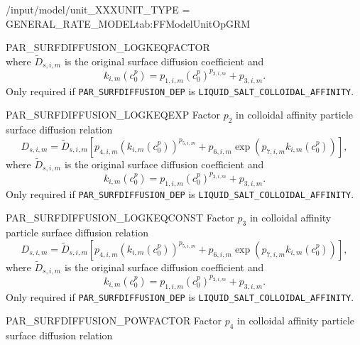 \begin{condsubgroup}{/input/model/unit\_XXX}{UNIT\_TYPE = GENERAL\_RATE\_MODEL}{tab:FFModelUnitOpGRM}
\begin{dataset}[unit=--,type=double,range={$\mathds{R}$},length={\texttt{NBND}}]{PAR\_SURFDIFFUSION\_LOGKEQFACTOR}
\begin{equation*}
    \end{equation*}
    where $\tilde{D}_{s,i,m}$ is the original surface diffusion coefficient and
    \begin{equation*}
      k_{i,m}( c^p_0 ) = p_{1,i,m} \left(c^p_0\right)^{p_{2,i,m}} + p_{3,i,m}.
    \end{equation*}
    Only required if \texttt{PAR\_SURFDIFFUSION\_DEP} is \texttt{LIQUID\_SALT\_COLLOIDAL\_AFFINITY}.
  \end{dataset}
  \begin{dataset}[unit=--,type=double,range={$\mathds{R}$},length={\texttt{NBND}}]{PAR\_SURFDIFFUSION\_LOGKEQEXP}
    Factor $p_2$ in colloidal affinity particle surface diffusion relation
    \begin{equation*}
      D_{s,i,m} = \tilde{D}_{s,i,m} \left[ p_{4,i,m} \left(k_{i,m}\left(c^p_0\right)\right)^{p_{5,i,m}} + p_{6,i,m} \exp\left( p_{7,i,m} k_{i,m}\left( c^p_0 \right) \right) \right],
    \end{equation*}
    where $\tilde{D}_{s,i,m}$ is the original surface diffusion coefficient and
    \begin{equation*}
      k_{i,m}( c^p_0 ) = p_{1,i,m} \left(c^p_0\right)^{p_{2,i,m}} + p_{3,i,m}.
    \end{equation*}
    Only required if \texttt{PAR\_SURFDIFFUSION\_DEP} is \texttt{LIQUID\_SALT\_COLLOIDAL\_AFFINITY}.
  \end{dataset}
  \begin{dataset}[unit=--,type=double,range={$\mathds{R}$},length={\texttt{NBND}}]{PAR\_SURFDIFFUSION\_LOGKEQCONST}
    Factor $p_3$ in colloidal affinity particle surface diffusion relation
    \begin{equation*}
      D_{s,i,m} = \tilde{D}_{s,i,m} \left[ p_{4,i,m} \left(k_{i,m}\left(c^p_0\right)\right)^{p_{5,i,m}} + p_{6,i,m} \exp\left( p_{7,i,m} k_{i,m}\left( c^p_0 \right) \right) \right],
    \end{equation*}
    where $\tilde{D}_{s,i,m}$ is the original surface diffusion coefficient and
    \begin{equation*}
      k_{i,m}( c^p_0 ) = p_{1,i,m} \left(c^p_0\right)^{p_{2,i,m}} + p_{3,i,m}.
    \end{equation*}
    Only required if \texttt{PAR\_SURFDIFFUSION\_DEP} is \texttt{LIQUID\_SALT\_COLLOIDAL\_AFFINITY}.
  \end{dataset}
  \begin{dataset}[unit=--,type=double,range={$\mathds{R}$},length={\texttt{NBND}}]{PAR\_SURFDIFFUSION\_POWFACTOR}
    Factor $p_4$ in colloidal affinity particle surface diffusion relation

\end{dataset}
\end{condsubgroup}
